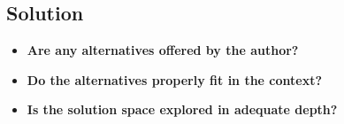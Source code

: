 \subsection{Solution}
\begin{itemize}
\item {\bf Are any alternatives offered by the author?}\\ 

\item {\bf Do the alternatives properly fit in the context?}\\ 

\item {\bf Is the solution space explored in adequate depth?}\\ 

\end{itemize}
